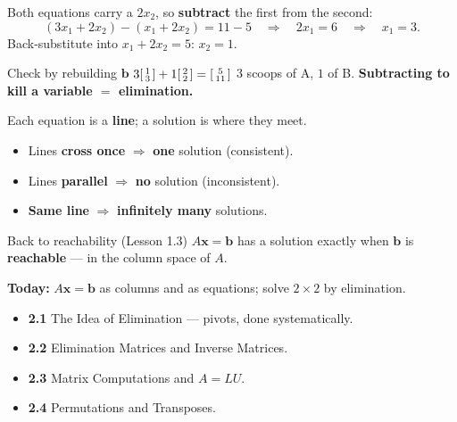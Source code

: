 \documentclass[aspectratio=169, 11pt]{beamer}
\newcommand{\xx}{\mathbf{x}}
\newcommand{\bb}{\mathbf{b}}
\begin{document}
\begin{frame}[t, plain]
  Both equations carry a $2x_2$, so \textbf{subtract} the first from the second:
  \[
    (3x_1+2x_2)-(x_1+2x_2) = 11-5
    \quad\Longrightarrow\quad 2x_1 = 6 \quad\Longrightarrow\quad x_1 = 3.
  \]
  Back-substitute into $x_1+2x_2=5$: \quad $x_2 = 1$.
  \begin{block}{Check by rebuilding $\bb$}
    $3\begin{bsmallmatrix} 1 \\ 3 \end{bsmallmatrix}
     + 1\begin{bsmallmatrix} 2 \\ 2 \end{bsmallmatrix}
     = \begin{bsmallmatrix} 5 \\ 11 \end{bsmallmatrix}$ \checkmark\quad
    $3$ scoops of A, $1$ of B. \textbf{Subtracting to kill a variable $=$ elimination.}
  \end{block}
\end{frame}

\begin{frame}[t, plain]
  Each equation is a \textbf{line}; a solution is where they meet.
  \begin{itemize}
    \setlength{\itemsep}{5pt}
    \item Lines \textbf{cross once} $\Rightarrow$ \textbf{one} solution (consistent).
    \item Lines \textbf{parallel} $\Rightarrow$ \textbf{no} solution (inconsistent).
    \item \textbf{Same line} $\Rightarrow$ \textbf{infinitely many} solutions.
  \end{itemize}
  \vspace{4pt}
  \begin{block}{Back to reachability (Lesson 1.3)}
    $A\xx=\bb$ has a solution exactly when $\bb$ is \textbf{reachable} --- in the column space of $A$.
  \end{block}
\end{frame}

\begin{frame}[t, plain]
  \textbf{Today:} $A\xx=\bb$ as columns and as equations; solve $2\times 2$ by elimination.\\[8pt]
  \begin{itemize}
    \setlength{\itemsep}{4pt}
    \item \textbf{2.1} The Idea of Elimination --- pivots, done systematically.
    \item \textbf{2.2} Elimination Matrices and Inverse Matrices.
    \item \textbf{2.3} Matrix Computations and $A=LU$.
    \item \textbf{2.4} Permutations and Transposes.
  \end{itemize}
\end{frame}
\end{document}
